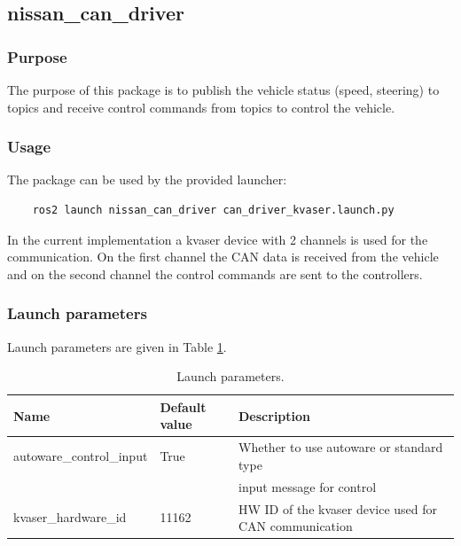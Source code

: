 \documentclass[sn-mathphys-num]{sn-jnl}%
\begin{document}
\subsection{nissan\_can\_driver}
\subsubsection{Purpose}
The purpose of this package is to publish the vehicle status (speed, steering) to topics and receive control commands from topics to control the vehicle.
\subsubsection{Usage}
The package can be used by the provided launcher:
\begin{lstlisting}
    ros2 launch nissan_can_driver can_driver_kvaser.launch.py
\end{lstlisting}
In the current implementation a kvaser device with 2 channels is used for the communication. On the first channel the CAN data is received from the vehicle and on the second channel the control commands are sent to the controllers.
\subsubsection{Launch parameters}
Launch parameters are given in Table \ref{tab:nissan_can_driver_params}.
\begin{table}[!h]
    \centering
    \captionsetup{justification=centering}
    \normalsize
    \caption{\label{tab:nissan_can_driver_params} Launch parameters.}
    \begin{tabular}{| l | l | l |}
        \hline
        \textbf{Name} & \textbf{Default value} & \textbf{Description} \\
        \hline
        autoware\_control\_input & True  & Whether to use autoware or standard type \\
                                 &       & input message for control \\
        \hline
        kvaser\_hardware\_id     & 11162 & HW ID of the kvaser device used for CAN communication \\
        \hline
    \end{tabular}
\end{table}
\end{document}
